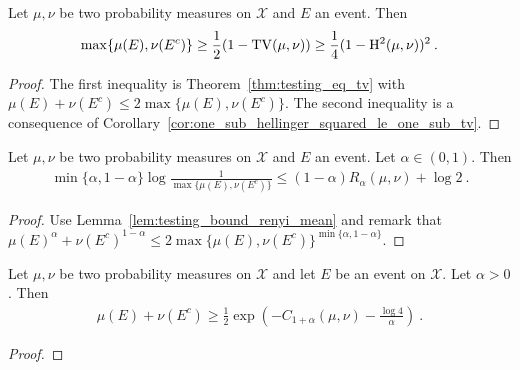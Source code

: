 \begin{lemma}
  \label{lem:testing_bound_tv_hellinger_max}
  Let $\mu, \nu$ be two probability measures on $\mathcal X$ and $E$ an event. Then
  \begin{align*}
  \max\{\mu(E), \nu(E^c)\}
  \ge \frac{1}{2}(1 - \operatorname{TV}(\mu, \nu))
  \ge \frac{1}{4}(1 - \operatorname{H^2}(\mu, \nu))^2
  \: .
  \end{align*}
\end{lemma}

\begin{proof}
The first inequality is Theorem~\ref{thm:testing_eq_tv} with $\mu(E) + \nu(E^c) \le 2 \max\{\mu(E), \nu(E^c)\}$.
The second inequality is a consequence of Corollary~\ref{cor:one_sub_hellinger_squared_le_one_sub_tv}.
\end{proof}

\begin{lemma}
  \label{lem:testing_bound_renyi_max}
  Let $\mu, \nu$ be two probability measures on $\mathcal X$ and $E$ an event. Let $\alpha \in (0,1)$. Then
  \begin{align*}
  \min\{\alpha, 1 - \alpha\} \log\frac{1}{\max\{\mu(E), \nu(E^c)\}} \le (1 - \alpha) R_{\alpha}(\mu, \nu)  + \log 2 \: .
  \end{align*}
\end{lemma}

\begin{proof}
Use Lemma~\ref{lem:testing_bound_renyi_mean} and remark that $\mu(E)^\alpha + \nu(E^c)^{1 - \alpha} \le 2\max\{\mu(E), \nu(E^c)\}^{\min\{\alpha, 1 - \alpha\}}$.
\end{proof}


\begin{lemma}
  \label{lem:testing_bound_renyi_one_add}
  \leanok
  Let $\mu, \nu$ be two probability measures on $\mathcal X$ and let $E$ be an event on $\mathcal X$. Let $\alpha > 0$. Then
  \begin{align*}
  \mu(E) + \nu(E^c) \ge \frac{1}{2}\exp\left( - C_{1+\alpha}(\mu, \nu) - \frac{\log 4}{\alpha}\right) \: .
  \end{align*}
\end{lemma}

\begin{proof}%
{}
\end{proof}


